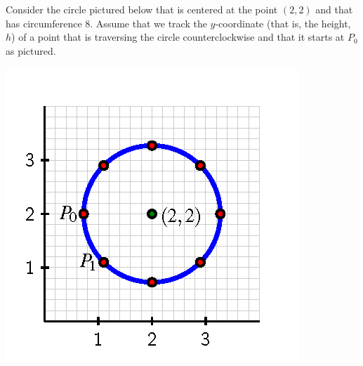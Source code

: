 \documentclass[nooutcomes, noauthor]{ximera}
\begin{document}
\begin{exploration}
Consider the circle pictured below that is centered at the point \((2,2)\) and that has circumference \(8\).  Assume that we track the \(y\)-coordinate (that is, the height, \(h\)) of a point that is traversing the circle counterclockwise and that it starts at \(P_0\) as pictured.

\begin{image}
\includegraphics{traversing-act-circle.png}
\end{image}


\end{exploration}
\end{document}
